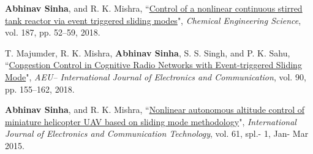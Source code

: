 \begin{etaremune}[leftmargin=1cm]
	\item \textbf{Abhinav Sinha}, and R. K. Mishra, ``\href{https://www.sciencedirect.com/science/article/pii/S0009250918302719}{Control of a nonlinear continuous stirred tank reactor via event triggered sliding modes}", \emph{Chemical Engineering Science}, vol. 187, pp. 52--59, 2018.
	\item T. Majumder, R. K. Mishra, \textbf{Abhinav Sinha}, S. S. Singh, and P. K. Sahu, ``\href{https://www.sciencedirect.com/science/article/pii/S1434841117325438}{Congestion Control in Cognitive Radio Networks with Event-triggered Sliding Mode}", \emph{AEU-- International Journal of Electronics and Communication}, vol. 90, pp. 155--162, 2018.
	\item \textbf{Abhinav Sinha}, and R. K. Mishra, ``\href{https://www.researchgate.net/publication/267637784\_Nonlinear\_autonomous\_altitude\_control\_of\_a\_miniature\_helicopter\_UAV\_based\_on\_sliding\_mode\_methodology/}{Nonlinear autonomous altitude control of miniature helicopter UAV based on sliding mode methodology}", \emph{International Journal of Electronics and Communication Technology}, vol. 61, spl.- 1, Jan- Mar 2015.
\end{etaremune}\medskip

